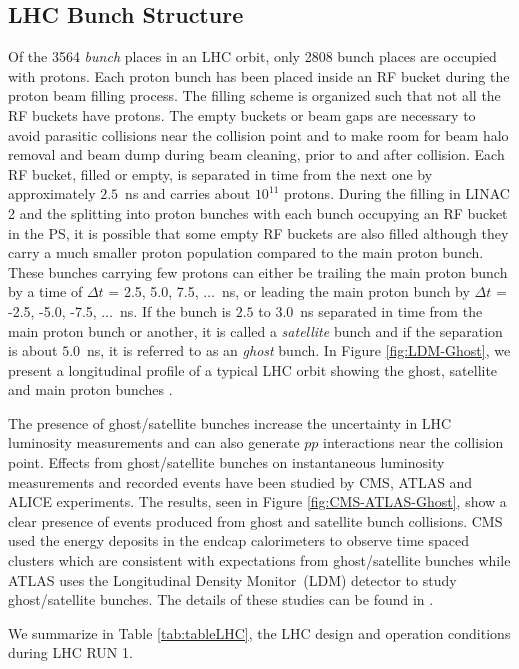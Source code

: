 \subsection{LHC Bunch Structure}\label{Ghost}
Of the 3564 \textit{bunch} places in an LHC orbit, only 2808 bunch places are occupied with protons. Each proton bunch has been placed inside an RF bucket during the proton beam filling process. The filling scheme is organized such that not all the RF buckets have protons. The empty buckets or beam gaps are necessary to avoid parasitic collisions near the collision point and to make room for beam halo removal and beam dump during beam cleaning, prior to and after collision.
Each RF bucket, filled or empty, is separated in time from the next one by approximately $2.5$~ns and carries about $10^{11}$ protons. During the filling in LINAC 2 and the splitting into proton bunches with each bunch occupying an RF bucket in the PS, it is possible that some empty RF buckets are also filled although they carry a much smaller proton population compared to the main proton bunch. These bunches carrying few protons can either be trailing the main proton bunch by a time of $\Delta t$ = 2.5, 5.0, 7.5, $\ldots$~ns, or leading the main proton bunch by $\Delta t$ = -2.5, -5.0, -7.5, $\ldots$~ns. If the bunch is $2.5$ to $3.0$~ns separated in time from the main proton bunch or another, it is called a \textit{satellite} bunch and if the separation is about $5.0$~ns, it is referred to as an \textit{ghost} bunch.  In Figure \ref{fig:LDM-Ghost}, we present a longitudinal profile of a typical LHC orbit showing the ghost, satellite and main proton bunches \cite{LDM}.
\par 
The presence of ghost/satellite bunches increase the uncertainty in LHC luminosity measurements and can also generate $pp$ interactions near the collision point. Effects from ghost/satellite bunches on instantaneous luminosity measurements and recorded events have been studied  by CMS, ATLAS and ALICE experiments. The results, seen in Figure \ref{fig:CMS-ATLAS-Ghost}, show a clear presence of events produced from ghost and satellite bunch collisions. CMS used the energy deposits in the endcap calorimeters to observe time spaced clusters which are consistent with expectations from ghost/satellite bunches while ATLAS uses the Longitudinal Density Monitor~(LDM) detector to study ghost/satellite bunches. The details of these studies can be found in \cite{ATLAS-GHOST, CMS-GHOST}.
\par
We summarize in Table \ref{tab:tableLHC}, the LHC design and operation conditions during LHC RUN 1. 
 
